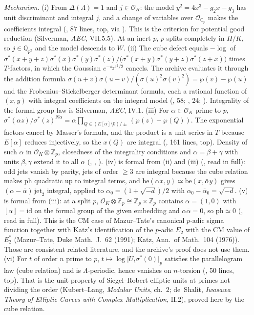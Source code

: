 \documentclass[11pt]{article}
\theoremstyle{remark}
\begin{document}
\noindent\emph{Mechanism.} (i) From $\Delta(\Lambda)=1$ and $j\in\mathcal O_H$: the model $y^2=4x^3-g_2x-g_3$ has unit discriminant and integral $j$, and a change of variables over $\mathcal O_{\mathbb C_p}$ makes the coefficients integral (, 87 lines, top, via ). This is the criterion for potential good reduction (Silverman, \emph{AEC}, VII.5.5). At an inert $p$, $p$ splits completely in $H/K$, so $j\in\mathbb Q_{p^2}$ and the model descends to $W$. (ii) The cube defect equals $-\log$ of $\sigma^*(x+y+z)\sigma^*(x)\sigma^*(y)\sigma^*(z)/\bigl(\sigma^*(x+y)\sigma^*(y+z)\sigma^*(z+x)\bigr)$ times $T$-factors, in which the Gaussian $e^{-s_2z^2/2}$ cancels. The archive evaluates it through the addition formula $\sigma(u+v)\sigma(u-v)/(\sigma(u)^2\sigma(v)^2)=\wp(v)-\wp(u)$ and the Frobenius--Stickelberger determinant formula, each a rational function of $(x,y)$ with integral coefficients on the integral model (, 58; , 24; ). Integrality of the formal group law is Silverman, \emph{AEC}, IV.1. (iii) For $\alpha\in\mathcal O_K$ prime to $p$, $\sigma^*(\alpha z)/\sigma^*(z)^{N\alpha}=\alpha\prod_{Q\in(E[\alpha]\setminus0)/\pm}(\wp(z)-\wp(Q))$. The exponential factors cancel by Masser's formula, and the product is a unit series in $T$ because $E[\alpha]$ reduces injectively, so the $x(Q)$ are integral (, 161 lines, top). Density of such $\alpha$ in $\mathcal O_K\otimes\mathbb Z_p$, closedness of the integrality conditions and $\alpha=\beta+\gamma$ with units $\beta,\gamma$ extend it to all $\alpha$ (, , ). (iv) is formal from (ii) and (iii) (, read in full): odd jets vanish by parity, jets of order $\ge3$ are integral because the cube relation makes $\mathrm{ph}$ quadratic up to integral terms, and $\mathrm{be}(\alpha x,y)\simeq\mathrm{be}(x,\bar\alpha y)$ gives $(\alpha-\bar\alpha)\,\mathrm{jet}_2$ integral, applied to $\alpha_0=(1+\sqrt{-d})/2$ with $\alpha_0-\bar\alpha_0=\sqrt{-d}$. (v) is formal from (iii): at a split $p$, $\mathcal O_K\otimes\mathbb Z_p\cong\mathbb Z_p\times\mathbb Z_p$ contains $\alpha=(1,0)$ with $[\alpha]=\mathrm{id}$ on the formal group of the given embedding and $\alpha\bar\alpha=0$, so $\mathrm{ph}\simeq0$ (, read in full). This is the CM case of Mazur--Tate's canonical $p$-adic sigma function together with Katz's identification of the $p$-adic $E_2$ with the CM value of $E_2^*$ (Mazur--Tate, Duke Math.\ J.\ 62 (1991); Katz, Ann.\ of Math.\ 104 (1976)). Those are consistent related literature, and the archive's proof does not use them. (vi) For $t$ of order $n$ prime to $p$, $t\mapsto\log\lvert U_t\sigma^*(0)\rvert_p$ satisfies the parallelogram law (cube relation) and is $\Lambda$-periodic, hence vanishes on $n$-torsion (, 50 lines, top). That is the unit property of Siegel--Robert elliptic units at primes not dividing the order (Kubert--Lang, \emph{Modular Units}, ch.~2; de~Shalit, \emph{Iwasawa Theory of Elliptic Curves with Complex Multiplication}, II.2), proved here by the cube relation.
\end{document}
